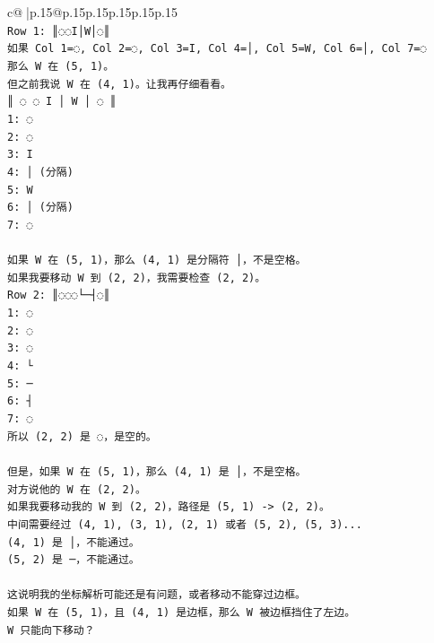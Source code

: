 \documentclass{article}
\begin{document}
{\begin{supertabular}{c@{$\;$}|p{.15\linewidth}@{}p{.15\linewidth}p{.15\linewidth}p{.15\linewidth}p{.15\linewidth}p{.15\linewidth}}
{{{\\ 
\texttt{Row 1: ║◌◌I│W│◌║} \\
\texttt{如果 Col 1=◌, Col 2=◌, Col 3=I, Col 4=│, Col 5=W, Col 6=│, Col 7=◌} \\
\texttt{那么 W 在 (5, 1)。} \\
\texttt{但之前我说 W 在 (4, 1)。让我再仔细看看。} \\
\texttt{║ ◌ ◌ I │ W │ ◌ ║} \\
\texttt{1: ◌} \\
\texttt{2: ◌} \\
\texttt{3: I} \\
\texttt{4: │ (分隔)} \\
\texttt{5: W} \\
\texttt{6: │ (分隔)} \\
\texttt{7: ◌} \\
\\ 
\texttt{如果 W 在 (5, 1)，那么 (4, 1) 是分隔符 │，不是空格。} \\
\texttt{如果我要移动 W 到 (2, 2)，我需要检查 (2, 2)。} \\
\texttt{Row 2: ║◌◌◌└─┤◌║} \\
\texttt{1: ◌} \\
\texttt{2: ◌} \\
\texttt{3: ◌} \\
\texttt{4: └} \\
\texttt{5: ─} \\
\texttt{6: ┤} \\
\texttt{7: ◌} \\
\texttt{所以 (2, 2) 是 ◌，是空的。} \\
\\ 
\texttt{但是，如果 W 在 (5, 1)，那么 (4, 1) 是 │，不是空格。} \\
\texttt{对方说他的 W 在 (2, 2)。} \\
\texttt{如果我要移动我的 W 到 (2, 2)，路径是 (5, 1) {-}> (2, 2)。} \\
\texttt{中间需要经过 (4, 1), (3, 1), (2, 1) 或者 (5, 2), (5, 3)...} \\
\texttt{(4, 1) 是 │，不能通过。} \\
\texttt{(5, 2) 是 ─，不能通过。} \\
\\ 
\texttt{这说明我的坐标解析可能还是有问题，或者移动不能穿过边框。} \\
\texttt{如果 W 在 (5, 1)，且 (4, 1) 是边框，那么 W 被边框挡住了左边。} \\
\texttt{W 只能向下移动？} \\
}}}
\end{supertabular}}
\end{document}
